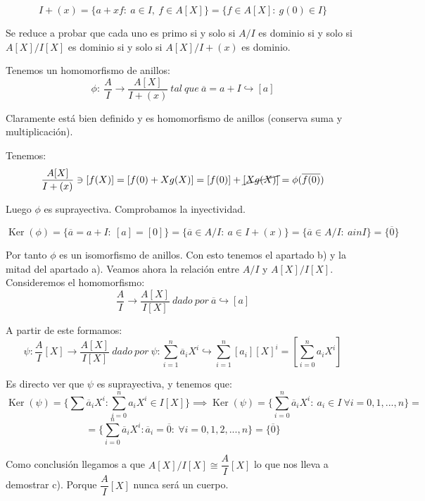 \documentclass[openany]{book}
\begin{document}
\begin{exercise}
    


    $$ I+(x) = \{a+xf:\ a \in I,\ f \in A[X]\} = \{f \in A[X]:\ g(0) \in I\} $$

    
    Se reduce a probar que cada uno es primo si y solo si $ A/I $ es dominio si y solo si $ A[X]/I[X] $ es dominio si y solo si $ A[X]/I+(x) $ es dominio.

    Tenemos un homomorfismo de anillos:
    $$ \phi:\ \dfrac{A}{I} \to \dfrac{A[X]}{I+(x)}\ tal\ que\ \overline{a}=a+I \hookrightarrow [a] $$

    Claramente está bien definido y es homomorfismo de anillos (conserva suma y multiplicación).
    
    Tenemos:
    $$ \dfrac{A[X]}{I+(x)}\ni [f(X)] = [f(0)+Xg(X) ] = [f(0)]+\cancel{[Xg(X)]} = \phi(\overline{f(0)}) $$
    
    Luego $ \phi $ es suprayectiva. Comprobamos la inyectividad.

    $$ \operatorname{Ker}(\phi) = \{\overline{a} = a+I:\ [a] = [0]\} = \{\overline{a} \in A/I:\ a \in I+(x)\} = \{\overline{a} \in A/I:\ ain I\} = \{\overline{0}\} $$

    Por tanto $ \phi  $ es un isomorfismo de anillos. Con esto tenemos el apartado b) y la mitad del apartado a). Veamos ahora la relación entre $ A/I $ y $ A[X]/I[X] $. Consideremos el homomorfismo:
    $$ \dfrac{A}{I} \to \dfrac{A[X]}{I[X]}\ dado\ por\ \overline{a}\hookrightarrow[a] $$

    A partir de este formamos:
    $$ \psi: \dfrac{A}{I}[X] \to \dfrac{A[X]}{I[X]}\ dado\ por\ \psi:\sum\limits_{i=1}^{n}\overline{a}_{i}X^{i} \hookrightarrow \sum\limits_{i=1}^{n}[a_i][X]^{i} = \left[ \sum\limits_{i=0}^{n}a_iX^{i}\right] $$

    Es directo ver que $ \psi $ es suprayectiva, y tenemos que:
    $$ \operatorname{Ker}(\psi) = \{\sum\limits_{}^{} \overline{a}_{i}X^{i}: \sum\limits_{i=0}^{n}a_iX^{i} \in I[X]\} \implies \operatorname{Ker}(\psi) = \{\sum\limits_{i=0}^{n}\overline{a}_{i}X^{i}:\ a_i \in I\ \forall i =0,1,...,n\} =  $$
    $$ = \{\sum\limits_{i=0}^{n} \overline{a}_{i} X^{i}: \overline{a}_{i} = \overline{0}:\ \forall i = 0,1,2,...,n\} = \{\overline{0}\} $$

    Como conclusión llegamos a que $ A[X]/I[X]\cong \dfrac{A}{I}[X] $ lo que nos lleva a demostrar c). Porque $ \dfrac{A}{I}[X] $ nunca será un cuerpo.





    
\end{exercise}
\end{document}
